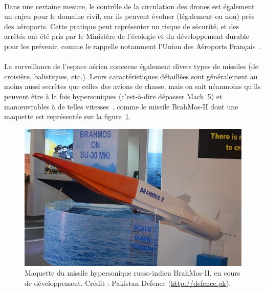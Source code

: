 	\paragraph{}
	Dans une certaine mesure, le contrôle de la circulation des drones est également un enjeu pour le domaine civil, car ils peuvent évoluer (légalement ou non) près des aéroports. Cette pratique peut représenter un risque de sécurité, et des arrêtés ont été pris par le Ministère de l'écologie et du développement durable pour les prévenir, comme le rappelle notamment l'Union des Aéroports Français~\cite{dronesuaf}.
	
	\paragraph{}
	La surveillance de l'espace aérien concerne également divers types de missiles (de croisière, balistiques, etc.). Leurs caractéristiques détaillées sont généralement au moins aussi secrètes que celles des avions de chasse, mais on sait néanmoins qu'ils peuvent être à la fois hypersoniques (c'est-à-dire dépasser Mach~5) et manœuvrables à de telles vitesses~\cite{missiles}, comme le missile BrahMos-II dont une maquette est représentée sur la figure~\ref{fig:brahmos}.
	
	\begin{figure}[ht]
		\centering
		\includegraphics[width=\textwidth]{figures/brahmos-II}
		\caption{Maquette du missile hypersonique russo-indien BrahMos-II, en cours de développement. Crédit : Pakistan Defence (\url{http://defence.pk}).}
		\label{fig:brahmos}
	\end{figure}
	
